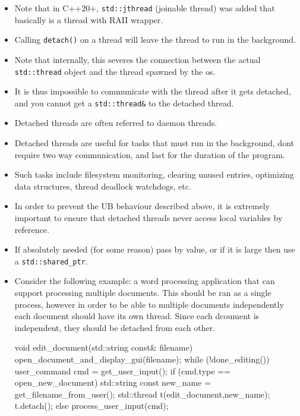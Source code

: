 \documentclass[11pt, a4paper]{article}
\theoremstyle{definition}
\theoremstyle{remark}
\newcommand{\code}[1]{\lstinline|#1|}
\begin{document}
\begin{itemize}
\begin{cppcode}
struct func;
void f() {
    int some_local_state{0};
    func my_func(some_local_state);
    std::thread t(my_func);
    thread_guard g(t);
    do_something_in_current_thread();
    // less verbose, and thread_guard is reusable
}
\end{cppcode}
    \item Note that in C++20+, \code{std::jthread} (joinable thread) was added that basically is a thread with RAII wrapper.
    \item Calling \code{detach()} on a thread will leave the thread to run in the background.
    \item Note that internally, this severes the connection between the actual \code{std::thread} object and the thread spawned by the os.
    \item It is thus impossible to communicate with the thread after it gets detached, and you cannot get a \code{std::thread&} to the detached thread.
    \item Detached threads are often referred to daemon threads.
    \item Detached threads are useful for tasks that must run in the background, dont require two way communication, and last for the duration of the program.
    \item Such tasks include filesystem monitoring, clearing unused entries, optimizing data structures, thread deadlock watchdogs, etc.
    \item In order to prevent the UB behaviour described above, it is extremely important to ensure that detached threads never access local variables by reference.
    \item If absolutely needed (for some reason) pass by value, or if it is large then use a \code{std::shared_ptr}.
    \item Consider the following example: a word processing application that can support processing multiple documents. This should be ran as a single process, however in order to be able to 
        multiple documents independently each document should have its own thread. Since each dcoument is independent, they should be detached from each other.
\begin{cppcode}
void edit_document(std::string const& filename) {
    open_document_and_display_gui(filename);
    while (!done_editing()) {
        user_command cmd = get_user_input();
        if (cmd.type == open_new_document) {
            std::string const new_name = get_filename_from_user();
            std::thread t(edit_document,new_name);
            t.detach();
        } else {
            process_user_input(cmd);
        }
    }
}
\end{cppcode}
\end{itemize}
\end{document}
